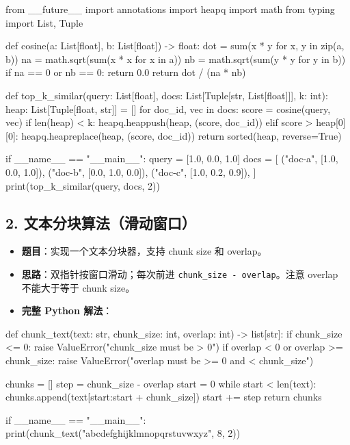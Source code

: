 \begin{codeblock}
from __future__ import annotations
import heapq
import math
from typing import List, Tuple


def cosine(a: List[float], b: List[float]) -> float:
    dot = sum(x * y for x, y in zip(a, b))
    na = math.sqrt(sum(x * x for x in a))
    nb = math.sqrt(sum(y * y for y in b))
    if na == 0 or nb == 0:
        return 0.0
    return dot / (na * nb)


def top_k_similar(query: List[float], docs: List[Tuple[str, List[float]]], k: int):
    heap: List[Tuple[float, str]] = []
    for doc_id, vec in docs:
        score = cosine(query, vec)
        if len(heap) < k:
            heapq.heappush(heap, (score, doc_id))
        elif score > heap[0][0]:
            heapq.heapreplace(heap, (score, doc_id))
    return sorted(heap, reverse=True)


if __name__ == "__main__":
    query = [1.0, 0.0, 1.0]
    docs = [
        ("doc-a", [1.0, 0.0, 1.0]),
        ("doc-b", [0.0, 1.0, 0.0]),
        ("doc-c", [1.0, 0.2, 0.9]),
    ]
    print(top_k_similar(query, docs, 2))
\end{codeblock}

\subsection{2. 文本分块算法（滑动窗口）}
\begin{itemize}[leftmargin=2em]
\item \textbf{题目}：实现一个文本分块器，支持 chunk size 和 overlap。
\item \textbf{思路}：双指针按窗口滑动；每次前进 \texttt{chunk\_size - overlap}。注意 overlap 不能大于等于 chunk size。
\item \textbf{完整 Python 解法}：
\end{itemize}

\begin{codeblock}
def chunk_text(text: str, chunk_size: int, overlap: int) -> list[str]:
    if chunk_size <= 0:
        raise ValueError("chunk_size must be > 0")
    if overlap < 0 or overlap >= chunk_size:
        raise ValueError("overlap must be >= 0 and < chunk_size")

    chunks = []
    step = chunk_size - overlap
    start = 0
    while start < len(text):
        chunks.append(text[start:start + chunk_size])
        start += step
    return chunks


if __name__ == "__main__":
    print(chunk_text("abcdefghijklmnopqrstuvwxyz", 8, 2))
\end{codeblock}

